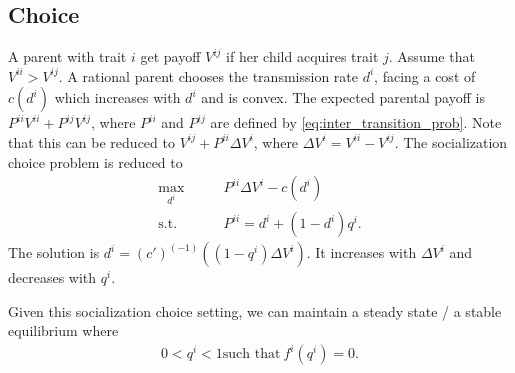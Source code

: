 \documentclass[12pt]{article}
\begin{document}
\subsection{Choice}
A parent with trait $i$ get payoff $V^{ij}$ if her child acquires trait $j$. Assume that $V^{ii}>V^{ij}$. A rational parent chooses the transmission rate $d^i$, facing a cost of $c(d^i)$ which increases with $d^i$ and is convex. The expected parental payoff is $P^{ii}V^{ii}+P^{ij}V^{ij}$, where $P^{ii}$ and $P^{ij}$ are defined by \eqref{eq:inter_transition_prob}. Note that this can be reduced to $V^{ij}+P^{ii}\Delta V^i$, where $\Delta V^i = V^{ii} - V^{ij}$. The socialization choice problem is reduced to
\begin{align}
    \max_{d^i} \qquad& P^{ii} \Delta V^i - c(d^i) \label{opt:socialization_choice} \\
    \text{s.t.} \qquad & P^{ii} = d^i + (1-d^i) q^i. \nonumber
\end{align}
The solution is $d^i = (c')^{(-1)}\left((1-q^i)\Delta V^i\right)$. It increases with $\Delta V^i$ and decreases with $q^i$. 

Given this socialization choice setting, we can maintain a steady state / a stable equilibrium where
\begin{align}
    0 < q^i < 1 \text{such that}\ f^i(q^i)=0. \label{eq:eqm_cond}
\end{align}




\setlength\bibsep{0pt}


\end{document}
